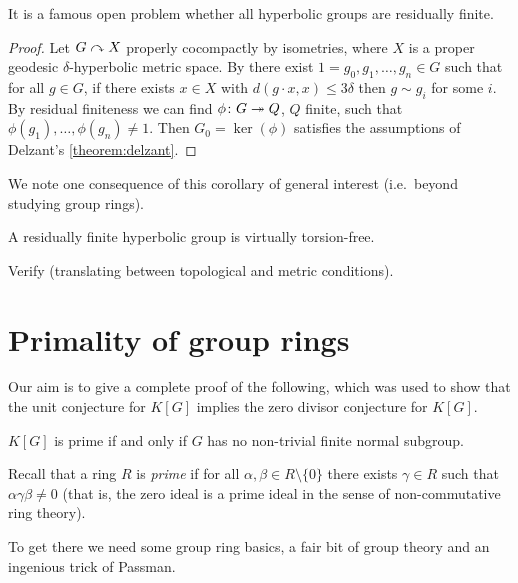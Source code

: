 \begin{remark}
    It is a famous open problem whether all hyperbolic groups are residually finite.
\end{remark}

\begin{proof}
    Let $G \curvearrowright X$ properly cocompactly by isometries, where $X$ is a proper geodesic $\delta$-hyperbolic metric space.
    By  there exist $1 = g_0, g_1, \dots, g_n \in G$ such that for all $g \in G$, if there exists $x \in X$ with $d(g \cdot x, x) \leq 3\delta$ then $g \sim g_i$ for some $i$.
    By residual finiteness we can find $\phi \colon G \twoheadrightarrow Q$, $Q$ finite, such that $\phi(g_1), \dots, \phi(g_n) \neq 1$.
    Then $G_0 = \ker(\phi)$ satisfies the assumptions of Delzant's \cref{theorem:delzant}.
\end{proof}

We note one consequence of this corollary of general interest (i.e.\ beyond studying group rings).
\begin{corollary}
    A residually finite hyperbolic group is virtually torsion-free.
\end{corollary}

\begin{exercise}
    Verify  (translating between topological and metric conditions).
\end{exercise}

\section{Primality of group rings}

Our aim is to give a complete proof of the following, which was used to show that the unit conjecture for $K[G]$ implies the zero divisor conjecture for $K[G]$.

\begin{theorem}[Connell]
    $K[G]$ is prime if and only if $G$ has no non-trivial finite normal subgroup.
\end{theorem}

Recall that a ring $R$ is \emph{prime} if for all $\alpha, \beta \in R \setminus \{0\}$ there exists $\gamma \in R$ such that $\alpha \gamma \beta \neq 0$ (that is, the zero ideal is a prime ideal in the sense of non-commutative ring theory).

To get there we need some group ring basics, a fair bit of group theory and an ingenious trick of Passman.

